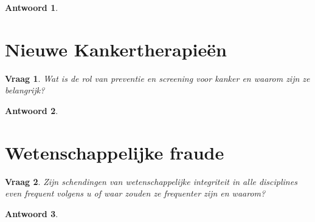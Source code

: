 \documentclass{article}
\theoremstyle{plain}
\newtheorem{question}{Vraag}
\theoremstyle{nonumberplain}
\newtheorem{answer}{Antwoord}
\begin{document}
\begin{answer}

\end{answer}

\section{Nieuwe Kankertherapieën}

\begin{question}
Wat is de rol van preventie en screening voor kanker en waarom zijn ze
belangrijk?
\end{question}

\begin{answer}

\end{answer}

\section{Wetenschappelijke fraude}

\begin{question}
Zijn schendingen van wetenschappelijke integriteit in alle disciplines even
frequent volgens u of waar zouden ze frequenter zijn en waarom?
\end{question}

\begin{answer}

\end{answer}
\end{document}
